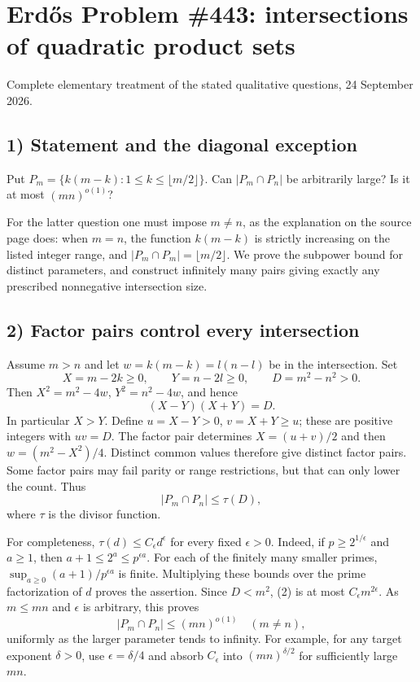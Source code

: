\section{Erd\H{o}s Problem \#443: intersections of quadratic product sets}
\noindent Complete elementary treatment of the stated qualitative questions, 24 September 2026.

\subsection*{1) Statement and the diagonal exception}
Put $P_m=\{k(m-k):1\le k\le\lfloor m/2\rfloor\}$. Can $|P_m\cap P_n|$ be arbitrarily large? Is it at most $(mn)^{o(1)}$?

For the latter question one must impose $m\ne n$, as the explanation on the source page does: when $m=n$, the function $k(m-k)$ is strictly increasing on the listed integer range, and $|P_m\cap P_m|=\lfloor m/2\rfloor$. We prove the subpower bound for distinct parameters, and construct infinitely many pairs giving exactly any prescribed nonnegative intersection size.

\subsection*{2) Factor pairs control every intersection}
Assume $m>n$ and let $w=k(m-k)=l(n-l)$ be in the intersection. Set
\[X=m-2k\ge0,\qquad Y=n-2l\ge0,\qquad D=m^2-n^2>0.\]
Then $X^2=m^2-4w$, $Y^2=n^2-4w$, and hence
\[(X-Y)(X+Y)=D.\tag{1}\]
In particular $X>Y$. Define $u=X-Y>0$, $v=X+Y\ge u$; these are positive integers with $uv=D$. The factor pair determines $X=(u+v)/2$ and then $w=(m^2-X^2)/4$. Distinct common values therefore give distinct factor pairs. Some factor pairs may fail parity or range restrictions, but that can only lower the count. Thus
\[|P_m\cap P_n|\le\tau(D),\tag{2}\]
where $\tau$ is the divisor function.

For completeness, $\tau(d)\le C_\epsilon d^\epsilon$ for every fixed $\epsilon>0$. Indeed, if $p\ge2^{1/\epsilon}$ and $a\ge1$, then $a+1\le2^a\le p^{\epsilon a}$. For each of the finitely many smaller primes, $\sup_{a\ge0}(a+1)/p^{\epsilon a}$ is finite. Multiplying these bounds over the prime factorization of $d$ proves the assertion. Since $D<m^2$, (2) is at most $C_\epsilon m^{2\epsilon}$. As $m\le mn$ and $\epsilon$ is arbitrary, this proves
\[|P_m\cap P_n|\le(mn)^{o(1)}\quad(m\ne n),\tag{3}\]
uniformly as the larger parameter tends to infinity. For example, for any target exponent $\delta>0$, use $\epsilon=\delta/4$ and absorb $C_\epsilon$ into $(mn)^{\delta/2}$ for sufficiently large $mn$.


